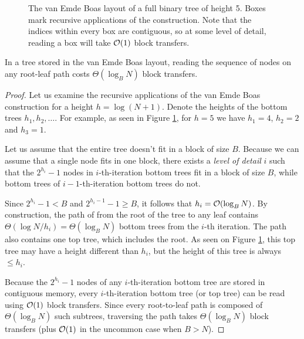 \begin{figure}

\caption{The van Emde Boas layout of a full binary tree of height 5.
Boxes mark recursive applications of the construction. Note that the indices
within every box are contiguous, so at some level of detail, reading
a box will take $\mathcal{O}(1)$ block transfers.}
\label{fig:veb_layout_5}
\end{figure}

\begin{theorem}
In a tree stored in the van Emde Boas layout, reading the sequence of nodes
on any root-leaf path costs $\Theta(\log_B N)$ block transfers.
\end{theorem}

\begin{proof}
Let us examine the recursive applications of the van Emde Boas construction
for a height $h=\log (N+1)$. Denote the heights of the bottom trees
$h_1, h_2, \ldots$. For example, as seen in Figure \ref{fig:veb_layout_5}, for
$h=5$ we have $h_1=4$, $h_2=2$ and $h_3=1$.

Let us assume that the entire tree doesn't fit in a block of size $B$.
Because we can assume that a single node fits in one block, there exists a \emph{level of
detail} $i$ such that the $2^{h_i}-1$ nodes in $i$-th-iteration bottom trees
fit in a block of size $B$, while bottom trees of $i-1$-th-iteration bottom
trees do not.

Since $2^{h_i}-1 < B$ and $2^{h_i-1}-1 \geq B$, it follows that $h_i=\mathcal{O}(\log_B N)$.
By construction, the path of from the root of the tree to any leaf contains
$\Theta(\log N/h_i)=\Theta(\log_B N)$ bottom trees from the $i$-th iteration.
The path also contains one top tree, which includes the root.
As seen on Figure \ref{fig:veb_layout_5}, this top tree may have a height
different than $h_i$, but the height of this tree is always $\leq h_i$.

Because the $2^{h_i}-1$ nodes of any $i$-th-iteration bottom tree are stored
in contiguous memory, every $i$-th-iteration bottom tree (or top tree)
can be read using $\mathcal{O}(1)$ block transfers. Since every root-to-leaf path
is composed of $\Theta(\log_B N)$ such subtrees, traversing the path
takes $\Theta(\log_B N)$ block transfers (plus $\mathcal{O}(1)$ in the uncommon
case when $B > N$).
\end{proof}


